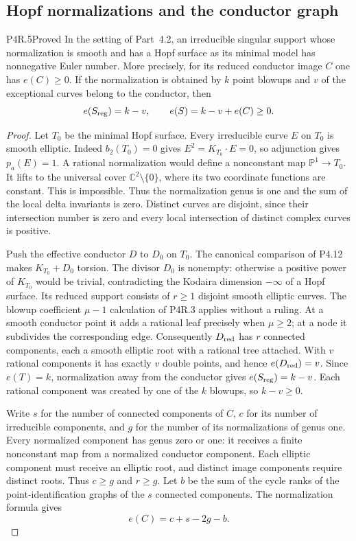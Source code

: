 \subsection{Hopf normalizations and the conductor graph}

\begin{statement}{P4R.5}{Proved}
In the setting of Part~4.2, an irreducible singular
support whose normalization is smooth and has a Hopf
surface as its minimal model has nonnegative Euler
number. More precisely, for its reduced conductor
image $C$ one has $e(C)\ge0$. If the normalization is
obtained by $k$ point blowups and $v$ of the exceptional
curves belong to the conductor, then
\[
 e(S_{\rm reg})=k-v,\qquad
 e(S)=k-v+e(C)\ge0.
\]
\end{statement}
\begin{proof}
Let $T_0$ be the minimal Hopf surface. Every
irreducible curve $E$ on $T_0$ is smooth elliptic.
Indeed $b_2(T_0)=0$ gives $E^2=K_{T_0}\cdot E=0$,
so adjunction gives $p_a(E)=1$. A rational
normalization would define a nonconstant map
$\mathbb P^1\to T_0$. It lifts to the universal
cover $\mathbb C^2\setminus\{0\}$, where its two
coordinate functions are constant. This is
impossible. Thus the normalization genus is one
and the sum of the local delta invariants is zero.
Distinct curves are disjoint, since their
intersection number is zero and every local
intersection of distinct complex curves is
positive.

Push the effective conductor $D$ to $D_0$ on
$T_0$. The canonical comparison of P4.12 makes
$K_{T_0}+D_0$ torsion. The divisor $D_0$ is
nonempty: otherwise a positive power of $K_{T_0}$
would be trivial, contradicting the Kodaira
dimension $-\infty$ of a Hopf surface. Its
reduced support consists of $r\ge1$ disjoint
smooth elliptic curves. The blowup coefficient
$\mu-1$ calculation of P4R.3 applies without a
ruling. At a smooth conductor point it adds a
rational leaf precisely when $\mu\ge2$; at a
node it subdivides the corresponding edge.
Consequently $D_{\rm red}$ has $r$ connected
components, each a smooth elliptic root with a
rational tree attached. With $v$ rational
components it has exactly $v$ double points,
and hence $e(D_{\rm red})=v$. Since
$e(T)=k$, normalization away from the conductor
gives $e(S_{\rm reg})=k-v$. Each rational
component was created by one of the $k$ blowups,
so $k-v\ge0$.

Write $s$ for the number of connected components
of $C$, $c$ for its number of irreducible
components, and $g$ for the number of its
normalizations of genus one. Every normalized
component has genus zero or one: it receives a
finite nonconstant map from a normalized
conductor component. Each elliptic component
must receive an elliptic root, and distinct
image components require distinct roots.
Thus $c\ge g$ and $r\ge g$. Let $b$ be the sum
of the cycle ranks of the point-identification
graphs of the $s$ connected components. The
normalization formula gives
\[
 e(C)=c+s-2g-b.
\]


\end{proof}
